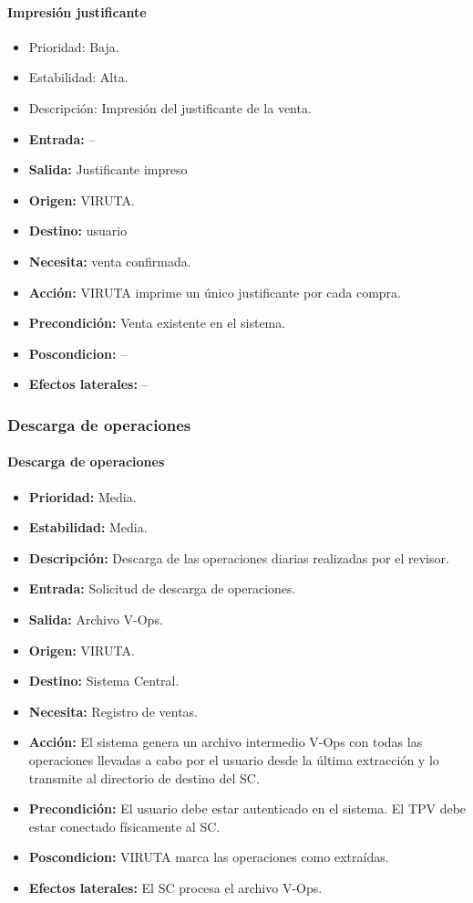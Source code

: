 \paragraph{Impresión justificante}

\begin{itemize}
\item Prioridad: Baja.
\item Estabilidad: Alta.
\item Descripción: Impresión del justificante de la venta.
\item \textbf{Entrada:} --
\item\textbf{ Salida:} Justificante impreso
\item  \textbf{Origen:} VIRUTA.
\item \textbf{Destino:} usuario
\item \textbf{Necesita:} venta confirmada.
\item \textbf{Acción:} VIRUTA imprime un único justificante por cada compra.
\item \textbf{Precondición:} Venta existente en el sistema.
\item \textbf{Poscondicion:} --
\item \textbf{Efectos laterales:} --
\end{itemize}

\subsubsection{Descarga de operaciones}

\paragraph{Descarga de operaciones}

\begin{itemize}
\item \textbf{Prioridad:} Media.
\item \textbf{Estabilidad:} Media.
\item \textbf{Descripción:} Descarga de las operaciones diarias realizadas por el revisor.
\item \textbf{Entrada:} Solicitud de descarga de operaciones.
\item \textbf{Salida:} Archivo V-Ops.
\item \textbf{Origen:} VIRUTA.
\item \textbf{Destino:} Sistema Central.
\item \textbf{Necesita:} Registro de ventas.
\item \textbf{Acción:} El sistema genera un archivo intermedio V-Ops con todas las operaciones llevadas a cabo por el usuario desde la última extracción y lo transmite al directorio de destino del SC.
\item \textbf{Precondición:} El usuario debe estar autenticado en el sistema. El TPV debe estar conectado físicamente al SC.
\item \textbf{Poscondicion:} VIRUTA marca las operaciones como extraídas.
\item \textbf{Efectos laterales:} El SC procesa el archivo V-Ops.
\end{itemize}

